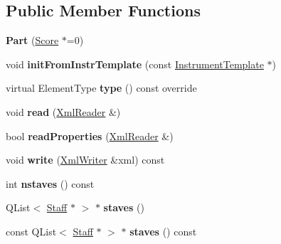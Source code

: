 \subsection*{Public Member Functions}
\begin{DoxyCompactItemize}
\item 
\mbox{\label{class_ms_1_1_part_a23a03278ba00f37930c218db377358aa}} 
{\bfseries Part} (\hyperlink{class_ms_1_1_score}{Score} $\ast$=0)
\item 
\mbox{\label{class_ms_1_1_part_a37456bf94d31f872c5a85f7c6575bd1c}} 
void {\bfseries init\+From\+Instr\+Template} (const \hyperlink{class_ms_1_1_instrument_template}{Instrument\+Template} $\ast$)
\item 
\mbox{\label{class_ms_1_1_part_a77da39b33e7904043d36fac77ce6eda7}} 
virtual Element\+Type {\bfseries type} () const override
\item 
\mbox{\label{class_ms_1_1_part_ae77e06ffac8a5d3870b231f98fda515f}} 
void {\bfseries read} (\hyperlink{class_ms_1_1_xml_reader}{Xml\+Reader} \&)
\item 
\mbox{\label{class_ms_1_1_part_a92622cbe30f0da4d7523d3a5ccdb6ae0}} 
bool {\bfseries read\+Properties} (\hyperlink{class_ms_1_1_xml_reader}{Xml\+Reader} \&)
\item 
\mbox{\label{class_ms_1_1_part_a0bc2986f52d436bb4fa4d26604d1921b}} 
void {\bfseries write} (\hyperlink{class_ms_1_1_xml_writer}{Xml\+Writer} \&xml) const
\item 
\mbox{\label{class_ms_1_1_part_ac0d6f1ee40e54d54510e2c2b56a7ec5c}} 
int {\bfseries nstaves} () const
\item 
\mbox{\label{class_ms_1_1_part_aa11473b705e1917640e87bba141cdee4}} 
Q\+List$<$ \hyperlink{class_ms_1_1_staff}{Staff} $\ast$ $>$ $\ast$ {\bfseries staves} ()
\item 
\mbox{\label{class_ms_1_1_part_a56540e2bb291ed2468f6b47569052f05}} 
const Q\+List$<$ \hyperlink{class_ms_1_1_staff}{Staff} $\ast$ $>$ $\ast$ {\bfseries staves} () const

\end{DoxyCompactItemize}
